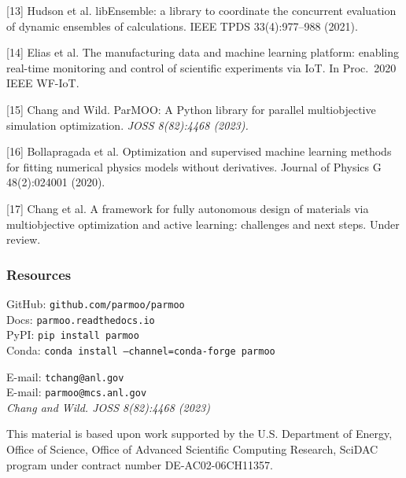 \documentclass[aspectratio=169]{beamer}
\begin{document}
\begin{frame}
{\medskip

[13] Hudson et al.
libEnsemble: a library to coordinate the concurrent evaluation of dynamic ensembles of calculations.
IEEE TPDS 33(4):977--988 (2021).

\medskip

[14] Elias et al.
The manufacturing data and machine learning platform: enabling real-time monitoring and control of scientific experiments via IoT.
In Proc.\ 2020 IEEE WF-IoT.

\medskip

[15] Chang and Wild.
ParMOO: A Python library for parallel multiobjective simulation optimization.
{\sl JOSS 8(82):4468 (2023).}

\medskip

[16] Bollapragada et al.
Optimization and supervised machine learning methods for fitting numerical physics models without derivatives.
Journal of Physics G 48(2):024001 (2020).

\medskip

[17] Chang et al.
A framework for fully autonomous design of materials via multiobjective optimization and active learning: challenges and next steps.
Under review.

}
\end{frame}

\begin{frame}\frametitle{Resources}
\begin{center}
{\large
GitHub: {\tt github.com/parmoo/parmoo}\\
Docs: {\tt parmoo.readthedocs.io}\\
PyPI: {\tt pip install parmoo}\\
Conda: {\tt conda install --channel=conda-forge parmoo}}

\bigskip
\bigskip

E-mail: {\tt tchang@anl.gov}\\
E-mail: {\tt parmoo@mcs.anl.gov}\\
\bigskip
\bigskip
{\sl Chang and Wild. JOSS 8(82):4468 (2023)}\\

\vfill

{\tiny This material is based upon work supported by the U.S. Department of Energy, Office of Science, Office of Advanced Scientific Computing Research, SciDAC program under contract number DE-AC02-06CH11357.\\}

\end{center}
\end{frame}
\end{document}

